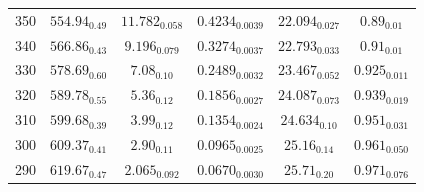 \documentclass[journal=jctc,manuscript=article]{achemso}
\begin{document}
\begin{table}[htb!]
\begin{center}
\begin{tabular}{|c|c|c|c|c|c|}
			350 & $554.94_{0.49}$ & $11.782_{0.058}$ & $0.4234_{0.0039}$ & $22.094_{0.027}$ & $0.89_{0.01}$ \\
			340 & $566.86_{0.43}$ & $9.196_{0.079}$ & $0.3274_{0.0037}$ & $22.793_{0.033}$ & $0.91_{0.01}$ \\
			330 & $578.69_{0.60}$ & $7.08_{0.10}$ & $0.2489_{0.0032}$ & $23.467_{0.052}$ & $0.925_{0.011}$ \\
			320 & $589.78_{0.55}$ & $5.36_{0.12}$ & $0.1856_{0.0027}$ & $24.087_{0.073}$ & $0.939_{0.019}$ \\
			310 & $599.68_{0.39}$ & $3.99_{0.12}$ & $0.1354_{0.0024}$ & $24.634_{0.10}$ & $0.951_{0.031}$ \\
			300 & $609.37_{0.41}$ & $2.90_{0.11}$ & $0.0965_{0.0025}$ & $25.16_{0.14}$ & $0.961_{0.050}$ \\
			290 & $619.67_{0.47}$ & $2.065_{0.092}$ & $0.0670_{0.0030}$ & $25.71_{0.20}$ & $0.971_{0.076}$ \\
			\hline
		\end{tabular}
	\end{center}
\end{table}
\end{document}
